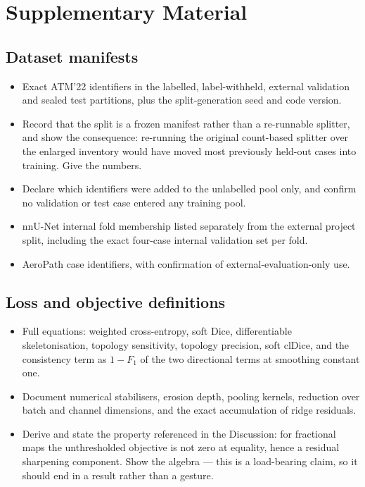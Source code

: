 \chapter{Supplementary Material}
\label{AppendixA}

%

\section{Dataset manifests}

\begin{itemize}
  \item Exact ATM'22 identifiers in the labelled, label-withheld, external validation and
  sealed test partitions, plus the split-generation seed and code version.
  \item Record that the split is a frozen manifest rather than a re-runnable splitter, and
  show the consequence: re-running the original count-based splitter over the enlarged
  inventory would have moved most previously held-out cases into training. Give the numbers.
  \item Declare which identifiers were added to the unlabelled pool only, and confirm no
  validation or test case entered any training pool.
  \item nnU-Net internal fold membership listed separately from the external project split,
  including the exact four-case internal validation set per fold.
  \item AeroPath case identifiers, with confirmation of external-evaluation-only use.
\end{itemize}

\section{Loss and objective definitions}

\begin{itemize}
  \item Full equations: weighted cross-entropy, soft Dice, differentiable skeletonisation,
  topology sensitivity, topology precision, soft clDice, and the consistency term as
  $1-F_1$ of the two directional terms at smoothing constant one.
  \item Document numerical stabilisers, erosion depth, pooling kernels, reduction over batch
  and channel dimensions, and the exact accumulation of ridge residuals.
  \item Derive and state the property referenced in the Discussion: for fractional maps the
  unthresholded objective is not zero at equality, hence a residual sharpening component.
  Show the algebra --- this is a load-bearing claim, so it should end in a result rather than
  a gesture.
\end{itemize}

